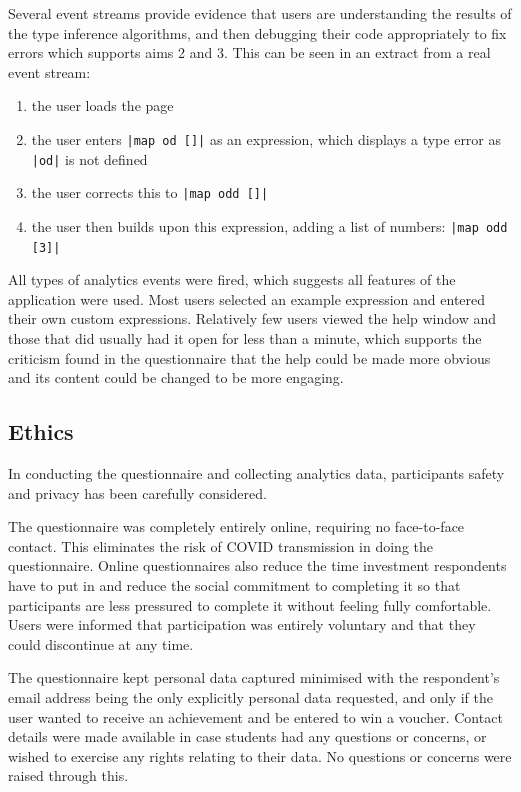 \documentclass[a4paper,fleqn,12pt]{article}
\begin{document}
Several event streams provide evidence that users are understanding the results of the type inference algorithms, and then debugging their code appropriately to fix errors which supports aims 2 and 3. This can be seen in an extract from a real event stream:
\begin{enumerate}
  \item the user loads the page
  \item the user enters \texttt{|map od []|} as an expression, which displays a type error as \texttt{|od|} is not defined
  \item the user corrects this to \texttt{|map odd []|}
  \item the user then builds upon this expression, adding a list of numbers: \texttt{|map odd [3]|}
\end{enumerate}

All types of analytics events were fired, which suggests all features of the application were used. Most users selected an example expression and entered their own custom expressions. Relatively few users viewed the help window and those that did usually had it open for less than a minute, which supports the criticism found in the questionnaire that the help could be made more obvious and its content could be changed to be more engaging.
\subsection{Ethics}\label{id:h.q5st3bb4afm1}
In conducting the questionnaire and collecting analytics data, participants safety and privacy has been carefully considered.

The questionnaire was completely entirely online, requiring no face-to-face contact. This eliminates the risk of COVID transmission in doing the questionnaire. Online questionnaires also reduce the time investment respondents have to put in and reduce the social commitment to completing it so that participants are less pressured to complete it without feeling fully comfortable. Users were informed that participation was entirely voluntary and that they could discontinue at any time.

The questionnaire kept personal data captured minimised with the respondent’s email address being the only explicitly personal data requested, and only if the user wanted to receive an achievement and be entered to win a voucher. Contact details were made available in case students had any questions or concerns, or wished to exercise any rights relating to their data. No questions or concerns were raised through this.
\end{document}
